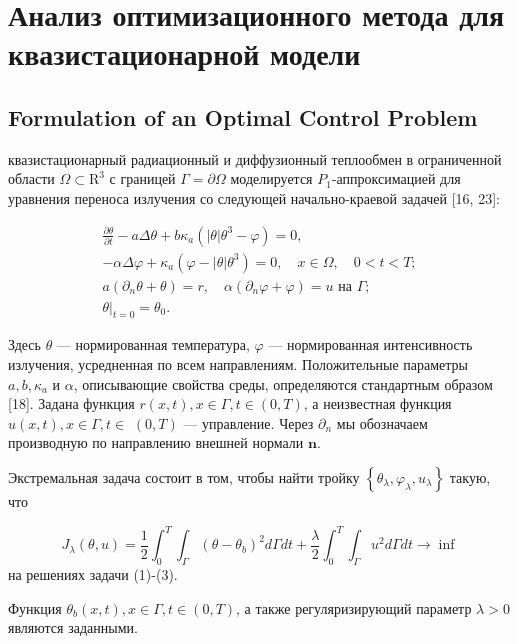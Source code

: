 \section{Анализ оптимизационного метода для квазистационарной модели}\label{sec:ch2/sec3}

\subsection{Formulation of an Optimal Control Problem}\label{subsec:ch2/sec3/subsec1}
квазистационарный радиационный и диффузионный теплообмен в ограниченной области
$\Omega \subset \mathrm{R}^{3}$ с границей $\Gamma=\partial \Omega$ моделируется
$P_{1}$-аппроксимацией для уравнения переноса излучения
со следующей начально-краевой задачей [16, 23]:

\[
\begin{gathered}
\frac{\partial \theta}{\partial t}-a \Delta \theta+b
\kappa_{a}\left(|\theta| \theta^{3}-\varphi\right)=0, \\
-\alpha \Delta \varphi+\kappa_{a}\left(\varphi-|\theta| \theta^{3}\right)=0,
\quad x \in \Omega, \quad 0<t<T; \\
a\left(\partial_{n} \theta+\theta\right)=r,
\quad \alpha\left(\partial_{n} \varphi+\varphi\right)=u \text { на } \Gamma; \\
\left.\theta\right|_{t=0}=\theta_{0}.
\end{gathered}
\]

Здесь $\theta$ — нормированная температура, $\varphi$ — нормированная интенсивность излучения,
усредненная по всем направлениям.
Положительные параметры $a, b, \kappa_{a}$ и $\alpha$, описывающие свойства среды,
определяются стандартным образом [18].
Задана функция $r(x, t), x \in \Gamma, t \in(0, T)$,
а неизвестная функция $u(x, t), x \in \Gamma, t \in$ $(0, T)$ — управление.
Через $\partial_{n}$ мы обозначаем производную по направлению внешней нормали $\mathbf{n}$.


Экстремальная задача состоит в том, чтобы найти тройку
$\left\{\theta_{\lambda}, \varphi_{\lambda}, u_{\lambda}\right\}$ такую, что

\[
J_{\lambda}(\theta, u)=\frac{1}{2} \int_{0}^{T}
\int_{\Gamma}\left(\theta-\theta_{b}\right)^{2} d \Gamma d t+\frac{\lambda}{2}
\int_{0}^{T} \int_{\Gamma} u^{2} d \Gamma d t \rightarrow \inf
\]
на решениях задачи (1)-(3).

Функция $\theta_{b}(x, t), x \in \Gamma, t \in(0, T)$,
а также регуляризирующий параметр $\lambda>0$ являются заданными.

